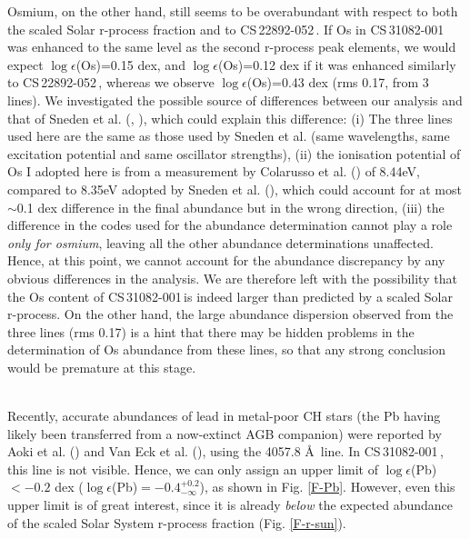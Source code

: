 \documentclass{aa}
\def\cs{CS\,31082-001\,}
\def\sned{CS\,22892-052\,}
\begin{document}
Osmium, on the other hand, still seems to be overabundant with respect
to both the scaled Solar r-process fraction and to \sned. If Os in \cs\, 
was enhanced
to the same level as the second r-process peak elements, we would expect
$\log \epsilon$(Os)=0.15 dex, and $\log \epsilon$(Os)=0.12 dex if it was
enhanced similarly to \sned, whereas we observe $\log
\epsilon$(Os)=0.43 dex (rms 0.17, from 3 lines). 
We investigated the
possible source of differences between our analysis and that of
Sneden et al. (\cite{sneden96}, \cite{sneden00}), which could explain
this difference: (i) The three lines used
here are the same as those used by Sneden et al. (same wavelengths, same excitation potential and same oscillator strengths), 
(ii) the ionisation potential of Os I adopted
here is from a measurement by  Colarusso et al. (\cite{colarusso97})
of 8.44eV, compared to 8.35eV adopted by Sneden et al. (\cite{sneden96}),
which could account for at most $\sim$0.1 dex difference in the final
abundance but in the wrong direction, (iii) the difference in the codes
used for the abundance determination cannot play a role {\it only for
osmium}, leaving all the other abundance determinations unaffected. 
Hence, at this point, we cannot account for the abundance discrepancy
by any obvious differences in the analysis. We are therefore left with the
possibility that the Os content of \cs is indeed larger than predicted
by a scaled Solar r-process. On  the other hand, the large abundance
dispersion observed from the three lines (rms 0.17) is a hint that
there may be hidden problems in the determination of Os abundance from
these lines, so that any strong conclusion would be premature at this stage.

\\
Recently, accurate abundances of lead in metal-poor CH stars (the Pb having 
likely been transferred from a now-extinct AGB companion) were reported
by Aoki et al. (\cite{aoki00}) and Van Eck et al.  (\cite{vaneck01}), using the
4057.8 \AA\ line.  In \cs, this line is not visible. Hence, we can only assign 
an upper limit of $\log \epsilon$(Pb)$<-0.2$ dex ($\log \epsilon$(Pb)$=
-0.4^{+0.2}_{-\infty}$), as shown in Fig. \ref{F-Pb}. However, even this upper
limit is of great interest, since it is already {\it below} the expected
abundance of the scaled Solar System r-process fraction (Fig. \ref{F-r-sun}).
\end{document}

